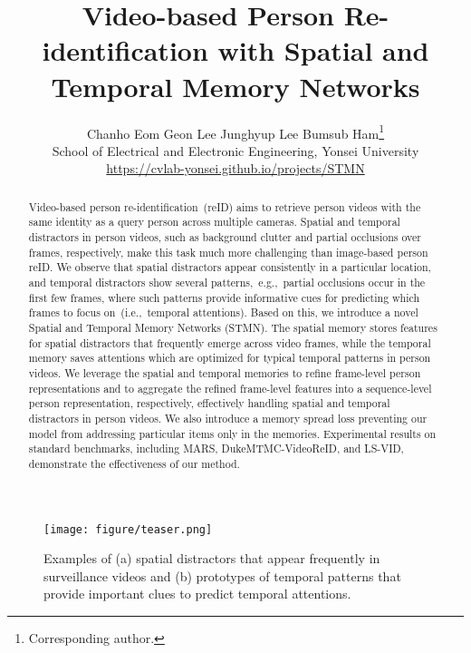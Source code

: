 \documentclass[10pt,twocolumn,letterpaper]{article}
\begin{document}
\title{Video-based Person Re-identification with Spatial and Temporal Memory Networks}

\author{
Chanho Eom \quad\quad\quad Geon Lee \quad\quad\quad Junghyup Lee \quad\quad\quad Bumsub Ham\thanks{Corresponding author.}\vspace*{0.2cm}\\
{School of Electrical and Electronic Engineering, Yonsei University}\\
\url{https://cvlab-yonsei.github.io/projects/STMN}
}

\maketitle
\ificcvfinal\thispagestyle{empty}\fi

\begin{abstract}
\vspace{-0.3cm}
Video-based person re-identification~(reID) aims to retrieve person videos with the same identity as a query person across multiple cameras. Spatial and temporal distractors in person videos, such as background clutter and partial occlusions over frames, respectively, make this task much more challenging than image-based person reID. We observe that spatial distractors appear consistently in a particular location, and temporal distractors show several patterns,~e.g.,~partial occlusions occur in the first few frames, where such patterns provide informative cues for predicting which frames to focus on~(i.e.,~temporal attentions). Based on this, we introduce a novel Spatial and Temporal Memory Networks (STMN). The spatial memory stores features for spatial distractors that frequently emerge across video frames, while the temporal memory saves attentions which are optimized for typical temporal patterns in person videos. We leverage the spatial and temporal memories to refine frame-level person representations and to aggregate the refined frame-level features into a sequence-level person representation, respectively, effectively handling spatial and temporal distractors in person videos. We also introduce a memory spread loss preventing our model from addressing particular items only in the memories. Experimental results on standard benchmarks, including MARS, DukeMTMC-VideoReID, and LS-VID, demonstrate the effectiveness of our method.
	\vspace{-0.4cm}
\end{abstract}
		
		\begin{figure}
			\centering
			\texttt{[image: figure/teaser.png]}
			\caption{Examples of (a) spatial distractors that appear frequently in surveillance videos and (b) prototypes of temporal patterns that provide important clues to predict temporal attentions.}
			\label{fig:teaser}
			\vspace{-0.4cm}
		\end{figure}
\end{document}
